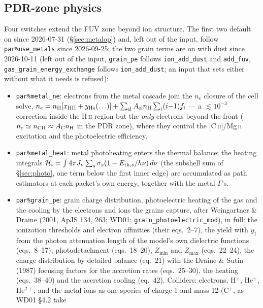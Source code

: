 \documentclass[english,a4paper]{my_memo}
\newcommand{\code}[1]{\texttt{#1}}
\begin{document}
\subsection{PDR-zone physics}
\label{sec:pdr}
Four switches extend the FUV zone beyond ion structure.  The first two
default on since 2026-07-31 (\S\ref{sec:metalop}) and, left out of the
input, follow \code{par\%use\_metals} since 2026-09-25; the two grain terms
are on with dust since 2026-10-11 (left out of the input, \code{grain\_pe}
follows \code{ion\_add\_dust} and \code{add\_fuv},
\code{gas\_grain\_energy\_exchange} follows \code{ion\_add\_dust}; an
input that sets either without what it needs is refused):
\begin{itemize}
\item \code{par\%metal\_ne}: electrons from the metal cascade join the
  $n_e$ closure of the cell solve,
  $n_e = n_{\rm H}[x_{\rm HII} + y_{\rm He}(\ldots)] +
  \sum_{\rm el} A_{\rm el} n_{\rm H} \sum_i (i{-}1) f_i$ --- a
  $\lesssim 10^{-3}$ correction inside the H\,\textsc{ii} region but
  the \emph{only} electrons beyond the front
  ($n_e \simeq n_{\rm CII} \approx A_{\rm C} n_{\rm H}$ in the PDR
  zone), where they control the [C\,\textsc{ii}]/Mg\,\textsc{ii}
  excitation and the photoelectric efficiency.
\item \code{par\%metal\_heat}: metal photoheating enters the thermal
  balance; the heating integrals $\mathcal{H}_i = \int 4\pi J_\nu
  \sum_s \sigma_s (1 - E_{{\rm th},s}/h\nu)\,d\nu$ (the subshell sum of
  \S\ref{sec:photo}, one term below the first inner edge) are accumulated
  as path estimators at each packet's own energy, together with the metal
  $\Gamma$'s.
\item \code{par\%grain\_pe}: grain charge distribution, photoelectric
  heating of the gas and the cooling by the electrons and ions the grains
  capture, after Weingartner \& Draine (2001, ApJS 134, 263; WD01;
  \code{grain\_photoelectric\_mod}), in full: the ionization thresholds
  and electron affinities (their eqs.~2--7), the yield with $y_1$ from the
  photon attenuation length of the model's own dielectric functions
  (eqs.~8--17), photodetachment (eqs.~18--20), $Z_{\min}$ and $Z_{\max}$
  (eqs.~22--24), the charge distribution by detailed balance (eq.~21) with
  the Draine \& Sutin (1987) focusing factors for the accretion rates
  (eqs.~25--30), the heating (eqs.~38--40) and the accretion cooling
  (eq.~42).  Colliders: electrons, H$^+$, He$^+$, He$^{2+}$, and the metal
  ions as one species of charge 1 and mass 12 (C$^+$, as WD01 \S4.2 take

\end{itemize}
\end{document}
